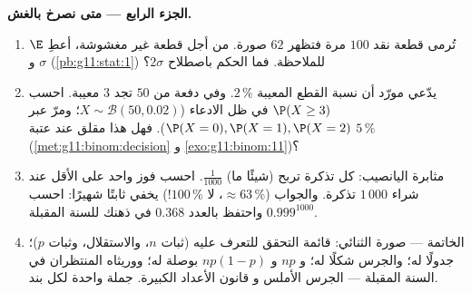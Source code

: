 \begin{problem}
\medskip
\noindent\textbf{الجزء الرابع --- متى نصرخ بالغش.}
\begin{enumerate}[resume]
  \item تُرمى قطعة نقد $100$ مرة فتظهر $62$ صورة. من أجل
        قطعة غير مغشوشة، أعطِ $\E$ و $\sigma$ 
        (\cref{pb:g11:stat:1}) للملاحظة. فما الحكم
        باصطلاح $2\sigma$؟
  \item يدّعي مورّد أن نسبة القطع المعيبة $2\,\%$. وفي دفعة
        من $50$ تجد $3$ معيبة. احسب
        $\P(X \geq 3)$ في ظل الادعاء
        ($X \sim \mathcal B(50, 0.02)$؛ ومرّ عبر
        $\P(X = 0), \P(X = 1), \P(X = 2)$). فهل هذا مقلق عند
        عتبة $5\,\%$ (\cref{met:g11:binom:decision} و
        \cref{exo:g11:binom:11})؟
  \item مثابرة اليانصيب: كل تذكرة تربح (شيئًا ما) 
        $\frac{1}{1000}$. احسب 
        فوز واحد على الأقل عند شراء $1\,000$ تذكرة. والجواب
        ($\approx 63\,\%$، لا $100\,\%$!) يخفي ثابتًا شهيرًا:
        احسب $0.999^{1000}$ واحتفظ بالعدد
        $0.368$ في ذهنك للسنة المقبلة.
  \item الخاتمة --- صورة  الثنائي: قائمة التحقق
        للتعرف عليه (ثبات $n$، والاستقلال، وثبات $p$)؛
         جدولًا له؛ والجرس شكلًا له؛
        و $np$ و $np(1-p)$ بوصلة له؛ ووريثاه المنتظران
        في السنة المقبلة ---  الجرس الأملس و
        قانون الأعداد الكبيرة. جملة واحدة لكل بند.
\end{enumerate}
\end{problem}
